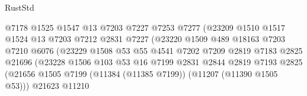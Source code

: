 \begin{lexlean}{RustStd}
\begin{coremodule}
                                      @7178
                                      @1525
                                      @1547
                                      @13
                                      @7203
                                      @7227
                                      @7253
                                      @7277
                                      (@23209
                                        @1510
                                        @1517
                                        @1524
                                        @13
                                        @7203
                                        @7212
                                        @2831
                                        @7227
                                        (@23220
                                          @1509
                                          @489
                                          @18163
                                          @7203
                                          @7210
                                          @6076
                                          (@23229
                                            @1508
                                            @53
                                            @55
                                            @4541
                                            @7202
                                            @7209
                                            @2819
                                            @7183
                                            @2825
                                            @21696
                                            (@23228
                                              @1506
                                              @103
                                              @53
                                              @16
                                              @7199
                                              @2831
                                              @2844
                                              @2819
                                              @7193
                                              @2825
                                              (@21656
                                                @1505
                                                @7199
                                                (@11384 (@11385 @7199))
                                                (@11207 (@11390 @1505 @53)))
                                              @21623
                                              @11210

\end{coremodule}
\end{lexlean}
